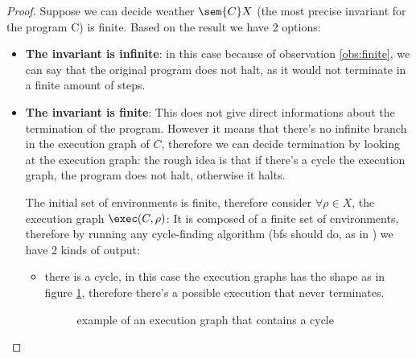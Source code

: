 \begin{proof}
  Suppose we can decide weather \(\sem{C}X\) (the most precise
  invariant for the program C) is finite. Based on the result we have
  2 options:
  \begin{itemize}
  \item \textbf{The invariant is infinite}: in this case because of
    observation \ref{obs:finite}, we can say that the original program
    does not halt, as it would not terminate in a finite amount of
    steps.
  \item \textbf{The invariant is finite}: This does not give direct
    informations about the termination of the program. However it
    means that there's no infinite branch in the execution graph of
    \(C\), therefore we can decide termination by looking at the
    execution graph: the rough idea is that if there's a cycle the
    execution graph, the program does not halt, otherwise it halts.

    The initial set of environments is finite, therefore consider
    \(\forall \rho \in X\), the execution graph \(\exec(C, \rho)\): It
    is composed of a finite set of environments, therefore by running
    any cycle-finding algorithm (bfs should do, as in
    \cite{cormen2022introduction}) we have 2 kinds of output:
    \begin{itemize}
    \item there is a cycle, in this case the execution graphs has the
      shape as in figure \ref{fig:cycle}, therefore there's a possible
      execution that never terminates.
      \begin{figure}
        \centering
        \usetikzlibrary{positioning}
        \caption{example of an execution graph that contains a
          cycle}\label{fig:cycle}
      \end{figure}
    \end{itemize}
  \end{itemize}
\end{proof}
